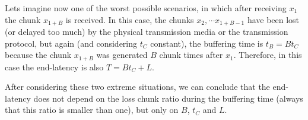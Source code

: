 Lets imagine now one of the worst possible scenarios, in which after
receiving $x_1$ the chunk $x_{1+B}$ is received. In this case, the
chunks $x_2, \cdots x_{1+B-1}$ have been lost (or delayed too much) by
the physical transmission media or the transmission protocol, but
again (and considering $t_C$ constant), the buffering time is $t_B=Bt_C$
because the chunk $x_{1+B}$ was generated $B$ chunk times after
$x_1$. Therefore, in this case the end-latency is also $T=Bt_C+L$.

After considering these two extreme situations, we can conclude that
the end-latency does not depend on the loss chunk ratio during the
buffering time (always that this ratio is smaller than one), but only
on $B$, $t_C$ and $L$.


\begin{comment}
An heuristic that
works is the described in the Fig.~\ref{fig:DBS_peer_buffering}. As
can be seen, $\text{chunk\_to\_play}$ points to the first received
chunk, that not necessary is the received chunk with lower
index. After that, the
buffering finishes when a chunk with index $\text{chunk\_to\_play} +
\text{BUFFER\_SIZE}/2$ has been received.\footnote{This not means that
  $\text{BUFFER\_SIZE}/2$ chunks are available in the buffer.}
\end{comment}
